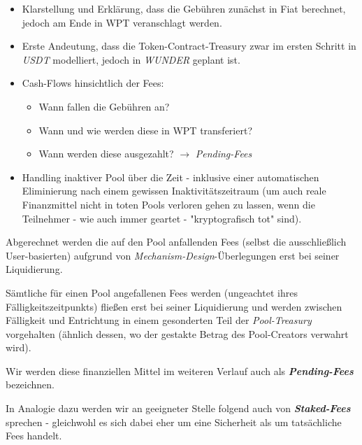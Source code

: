 \begin{itemize}
	\item Klarstellung und Erklärung, dass die Gebühren zunächst in Fiat berechnet, jedoch am Ende in WPT veranschlagt werden.
	\item Erste Andeutung, dass die Token-Contract-Treasury zwar im ersten Schritt in \textit{USDT} modelliert, jedoch in \textit{WUNDER} geplant ist.
	\item Cash-Flows hinsichtlich der Fees:
	\begin{itemize}
		\item Wann fallen die Gebühren an? 
		\item Wann und wie werden diese in WPT transferiert? 
		\item Wann werden diese ausgezahlt? $\rightarrow$ \textit{Pending-Fees}
	\end{itemize}
	\item Handling inaktiver Pool über die Zeit - inklusive einer automatischen Eliminierung nach einem gewissen Inaktivitätszeitraum (um auch reale Finanzmittel nicht in toten Pools verloren gehen zu lassen, wenn die Teilnehmer - wie auch immer geartet - "kryptografisch tot" sind).
\end{itemize}

\vspace{0.5cm}

Abgerechnet werden die auf den Pool anfallenden Fees (selbst die ausschließlich User-basierten) aufgrund von \textit{Mechanism-Design}-Überlegungen erst bei seiner Liquidierung.

\vspace{0.3cm}

\begin{Praemisse}[Abrechnung]

Sämtliche für einen Pool angefallenen Fees werden (ungeachtet ihres Fälligkeitszeit\-punkts) fließen erst bei seiner Liquidierung und werden zwischen Fälligkeit und Entrichtung in einem gesonderten Teil der \textit{Pool-Treasury} vorgehalten (ähnlich dessen, wo der gestakte Betrag des Pool-Creators verwahrt wird).

\vspace{0.2cm}

Wir werden diese finanziellen Mittel im weiteren Verlauf auch als \textbf{\textit{Pending-Fees}} bezeichnen.

\vspace{0.2cm}

In Analogie dazu werden wir an geeigneter Stelle folgend auch von \textbf{\textit{Staked-Fees}} sprechen - gleichwohl es sich dabei eher um eine Sicherheit als um tatsächliche Fees handelt.

\end{Praemisse}

\vspace{0.5cm}


